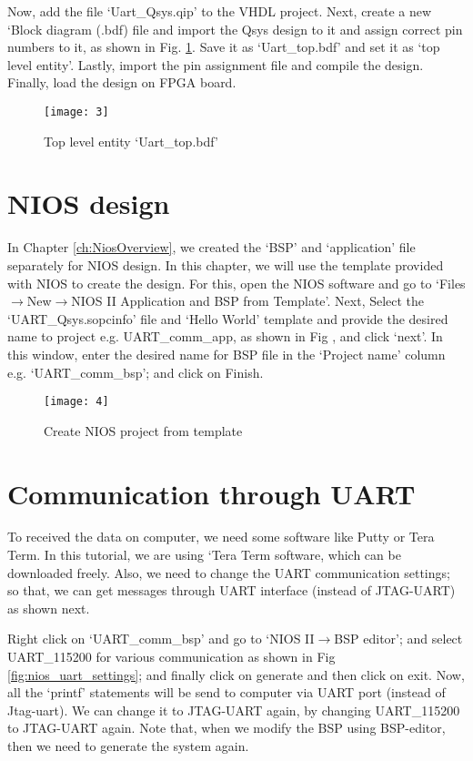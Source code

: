 Now, add the file `Uart\_Qsys.qip' to the VHDL project. Next, create a new `Block diagram (.bdf) file and import the Qsys design to it and assign correct pin numbers to it, as shown in Fig. \ref{fig:uart_top}. Save it as `Uart\_top.bdf' and set it as `top  level entity'. Lastly, import the pin assignment file and compile the design. Finally, load the design on FPGA board. 

\begin{figure}[!h]
	\centering
	\texttt{[image: 3]}
	\caption{Top level entity `Uart\_top.bdf'}
	\label{fig:uart_top}
\end{figure}

\section{NIOS design}
In Chapter \ref{ch:NiosOverview}, we created the `BSP' and `application' file separately for NIOS design. In this chapter, we will use the template provided with NIOS to create the design. For this, open the NIOS software and go to `Files$\rightarrow$New$\rightarrow$NIOS II Application and BSP from Template'. Next, Select the `UART\_Qsys.sopcinfo' file and `Hello World' template and provide the desired name to project e.g. UART\_comm\_app, as shown in Fig , and click `next'. In this window, enter the desired name for BSP file in the `Project name' column e.g. `UART\_comm\_bsp'; and click on Finish.  

\begin{figure}[!h]
	\centering
	\texttt{[image: 4]}
	\caption{Create NIOS project from template}
	\label{fig:nios_name_uart}
\end{figure}

\section{Communication through UART}
To received the data on computer, we need some software like Putty or Tera Term. In this tutorial, we are using `Tera Term software, which can be downloaded freely. Also, we need to change the UART communication settings; so that, we can get messages through UART interface (instead of JTAG-UART)  as shown next. 

Right click on `UART\_comm\_bsp' and go to `NIOS II$\rightarrow$BSP editor'; and select UART\_115200 for various communication as shown in Fig \ref{fig:nios_uart_settings}; and finally click on generate and then click on exit. Now, all the 	`printf' statements will be send to computer via UART port (instead of Jtag-uart). We can change it to JTAG-UART again, by changing UART\_115200 to JTAG-UART again. Note that, when we modify the BSP using BSP-editor, then we need to generate the system again.

